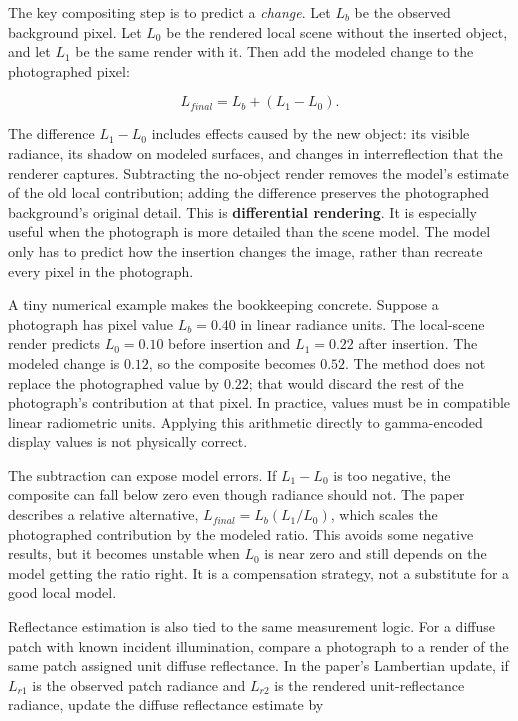 The key compositing step is to predict a \emph{change}. Let \(L_b\) be the observed background pixel. Let \(L_0\) be the rendered local scene without the inserted object, and let \(L_1\) be the same render with it. Then add the modeled change to the photographed pixel:

\[L_{final}=L_b+(L_1-L_0).\]

The difference \(L_1-L_0\) includes effects caused by the new object: its visible radiance, its shadow on modeled surfaces, and changes in interreflection that the renderer captures. Subtracting the no-object render removes the model's estimate of the old local contribution; adding the difference preserves the photographed background's original detail. This is \textbf{differential rendering}. It is especially useful when the photograph is more detailed than the scene model. The model only has to predict how the insertion changes the image, rather than recreate every pixel in the photograph.

A tiny numerical example makes the bookkeeping concrete. Suppose a photograph has pixel value \(L_b=0.40\) in linear radiance units. The local-scene render predicts \(L_0=0.10\) before insertion and \(L_1=0.22\) after insertion. The modeled change is \(0.12\), so the composite becomes \(0.52\). The method does not replace the photographed value by \(0.22\); that would discard the rest of the photograph's contribution at that pixel. In practice, values must be in compatible linear radiometric units. Applying this arithmetic directly to gamma-encoded display values is not physically correct.

The subtraction can expose model errors. If \(L_1-L_0\) is too negative, the composite can fall below zero even though radiance should not. The paper describes a relative alternative, \(L_{final}=L_b(L_1/L_0)\), which scales the photographed contribution by the modeled ratio. This avoids some negative results, but it becomes unstable when \(L_0\) is near zero and still depends on the model getting the ratio right. It is a compensation strategy, not a substitute for a good local model.

Reflectance estimation is also tied to the same measurement logic. For a diffuse patch with known incident illumination, compare a photograph to a render of the same patch assigned unit diffuse reflectance. In the paper's Lambertian update, if \(L_{r1}\) is the observed patch radiance and \(L_{r2}\) is the rendered unit-reflectance radiance, update the diffuse reflectance estimate by

